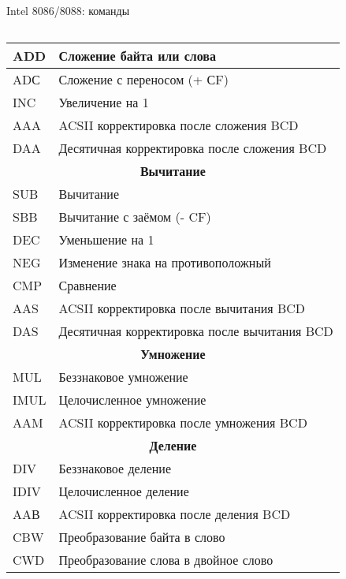 \documentclass[aspectratio=169,14pt]{beamer}
\begin{document}
\begin{frame}{Intel 8086/8088: команды}
\begin{columns}[t,onlytextwidth]
\begin{column}{0.5\textwidth}
\begin{tiny}
\begin{tabular}{|p{0.9cm}|p{5.4cm}|}
                ADD & Сложение байта или слова\\ \hline
                ADС & Сложение с переносом (+ СF)\\ \hline
                INC & Увеличение на 1\\ \hline
                AAA & ACSII корректировка после сложения BCD\\ \hline
                DAA & Десятичная корректировка после сложения BCD\\ \hline
                \multicolumn{2}{|c|}{\textbf{Вычитание}} \\ \hline
                SUB & Вычитание \\ \hline
                SBB & Вычитание с заёмом (- CF) \\ \hline
                DEC & Уменьшение на 1 \\ \hline
                NEG & Изменение знака на противоположный \\ \hline
                CMP & Сравнение \\ \hline
                AAS & ACSII корректировка после вычитания BCD \\ \hline
                DAS & Десятичная корректировка после вычитания BCD \\ \hline
                \multicolumn{2}{|c|}{\textbf{Умножение}} \\ \hline
                MUL & Беззнаковое умножение \\ \hline
                IMUL & Целочисленное умножение \\ \hline
                AAM & ACSII корректировка после умножения BCD \\ \hline
                \multicolumn{2}{|c|}{\textbf{Деление}} \\ \hline
                DIV & Беззнаковое деление \\ \hline
                IDIV & Целочисленное деление \\ \hline
                AAВ & ACSII корректировка после деления BCD \\ \hline
                CBW & Преобразование байта в слово \\ \hline
                CWD & Преобразование слова в двойное слово \\ \hline
            \end{tabular}
            \end{tiny}
        \end{column}
    \end{columns}
\end{frame}
\end{document}
